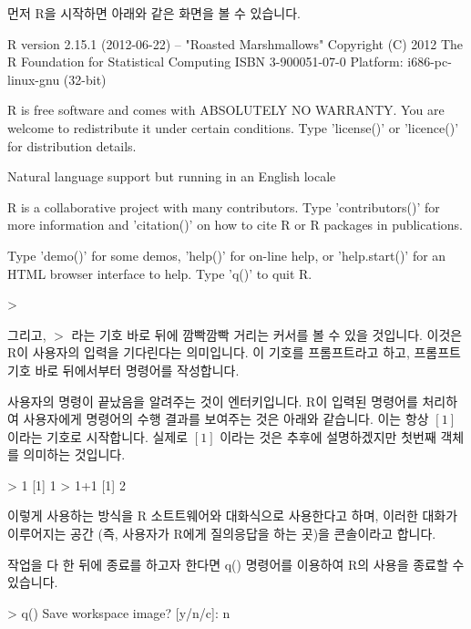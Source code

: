 \documentclass{book}
\begin{document}
먼저 R을 시작하면 아래와 같은 화면을 볼 수 있습니다.

\begin{Schunk}
\begin{Soutput}
R version 2.15.1 (2012-06-22) -- "Roasted Marshmallows"
Copyright (C) 2012 The R Foundation for Statistical Computing
ISBN 3-900051-07-0
Platform: i686-pc-linux-gnu (32-bit)

R is free software and comes with ABSOLUTELY NO WARRANTY.
You are welcome to redistribute it under certain conditions.
Type 'license()' or 'licence()' for distribution details.

  Natural language support but running in an English locale

R is a collaborative project with many contributors.
Type 'contributors()' for more information and
'citation()' on how to cite R or R packages in publications.

Type 'demo()' for some demos, 'help()' for on-line help, or
'help.start()' for an HTML browser interface to help.
Type 'q()' to quit R.

> 
\end{Soutput}
\end{Schunk}

그리고, $>$ 라는 기호 바로 뒤에 깜빡깜빡 거리는 커서를 볼 수 있을 것입니다. 
이것은 R이 사용자의 입력을 기다린다는 의미입니다. 
이 기호를 프롬프트라고 하고, 프롬프트 기호 바로 뒤에서부터 명령어를 작성합니다. 

사용자의 명령이 끝났음을 알려주는 것이 엔터키입니다. 
R이 입력된 명령어를 처리하여 사용자에게 명령어의 수행 결과를 보여주는 것은 아래와 같습니다.
이는 항상 $[1]$ 이라는 기호로 시작합니다. 
실제로 $[1]$ 이라는 것은 추후에 설명하겠지만 첫번째 객체를 의미하는 것입니다.

\begin{Schunk}
\begin{Soutput}
> 1
[1] 1
> 1+1
[1] 2
\end{Soutput}
\end{Schunk}

이렇게 사용하는 방식을 R 소트트웨어와 대화식으로 사용한다고 하며, 이러한 대화가 이루어지는 공간 (즉, 사용자가 R에게 질의응답을 하는 곳)을 콘솔이라고 합니다.


작업을 다 한 뒤에 종료를 하고자 한다면 q() 명령어를 이용하여 R의 사용을 종료할 수 있습니다. 

\begin{Schunk}
\begin{Soutput}
> q()
Save workspace image? [y/n/c]: n
\end{Soutput}
\end{Schunk}
\end{document}
